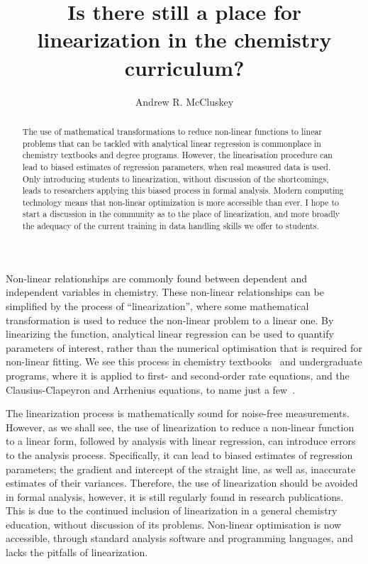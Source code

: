 \documentclass[journal=jceda8,manuscript=article]{achemso}
\author{Andrew R. McCluskey}
\affiliation{European Spallation Source ERIC, Ole Maaløes vej 3, 2200 København N, DK}
\title{Is there still a place for linearization in the chemistry curriculum?}
\begin{document}
\begin{abstract}
    The use of mathematical transformations to reduce non-linear functions to linear problems that can be tackled with analytical linear regression is commonplace in chemistry textbooks and degree programs. 
    However, the linearisation procedure can lead to biased estimates of regression parameters, when real measured data is used. 
    Only introducing students to linearization, without discussion of the shortcomings, leads to researchers applying this biased process in formal analysis.
    Modern computing technology means that non-linear optimization is more accessible than ever. 
    I hope to start a discussion in the community as to the place of linearization, and more broadly the adequacy of the current training in data handling skills we offer to students.
\end{abstract}

\maketitle 

Non-linear relationships are commonly found between dependent and independent variables in chemistry.
These non-linear relationships can be simplified by the process of ``linearization'', where some mathematical transformation is used to reduce the non-linear problem to a linear one. 
By linearizing the function, analytical linear regression can be used to quantify parameters of interest, rather than the numerical optimisation that is required for non-linear fitting. 
We see this process in chemistry textbooks~\cite{monk_math_2010,atkins_physical_2018} and undergraduate programs, where it is applied to  first- and second-order rate equations, and the Clausius-Clapeyron and Arrhenius equations, to name just a few~\cite{perrin_linear_2017,harper_data_2017,monk_math_2010}.

The linearization process is mathematically sound for noise-free measurements. 
However, as we shall see, the use of linearization to reduce a non-linear function to a linear form, followed by analysis with linear regression, can introduce errors to the analysis process. 
Specifically, it can lead to biased estimates of regression parameters; the gradient and intercept of the straight line, as well as, inaccurate estimates of their variances. 
Therefore, the use of linearization should be avoided in formal analysis, however, it is still regularly found in research publications. 
This is due to the continued inclusion of linearization in a general chemistry education, without discussion of its problems. 
Non-linear optimisation is now accessible, through standard analysis software and programming languages, and lacks the pitfalls of linearization. 
\end{document}
